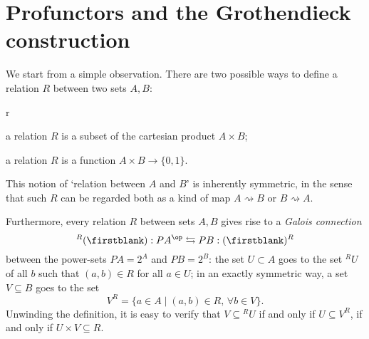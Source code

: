 \section{Profunctors and the Gro\-then\-dieck construction}
\label{sec:org7dd09e1}
We start from a simple observation.
There are two possible ways to define a relation $R$ between two sets $A,B$:
\begin{enumtag}{r}
	\item \label{r_1} a relation $R$ is a subset of the cartesian product $A\times B$;
	\item \label{r_2} a relation $R$ is a function $A\times B \to \{0,1\}$.
\end{enumtag}
This notion of `relation between $A$ and $B$' is inherently symmetric, in the sense that such $R$ can be regarded both as a kind of map $A \rightsquigarrow B$ or $B\rightsquigarrow A$.

Furthermore, every relation $R$ between sets $A,B$ gives rise to a \emph{Galois connection}
\[{}^R(\firstblank) :PA^\op \leftrightarrows PB : (\firstblank)^R \label{adjunzia} \]
between the power-sets $PA=2^A$ and $PB = 2^B$: the set $U\subset A$ goes to the set ${}^RU$ of all $b$ such that $(a,b)\in R$ for all $a\in U$; in an exactly symmetric way, a set $V\subseteq B$ goes to the set
\[V^R = \{a\in A\mid (a,b) \in R,\, \forall b\in V\}.\]
Unwinding the definition, it is easy to verify that $V\subseteq{}^RU$ if and only if $U\subseteq V^R$, if and only if $U\times V\subseteq R$.

